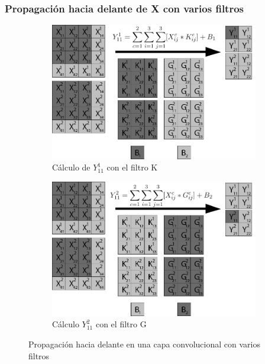 \subsubsection{Propagación hacia delante de X con varios filtros}

\begin{figure}[H]
	\centering
	\begin{subfigure}{.5\textwidth}
		\hspace{-10mm}
		\includegraphics[width=1.2\linewidth]{imagenes/conv_2kernels_1.jpg}  
		\caption{Cálculo de $Y^1_{11}$ con el filtro K}
	\end{subfigure}%
	\begin{subfigure}{.5\textwidth}
		\hspace{10mm}
		\includegraphics[width=1.2\linewidth]{imagenes/conv_2kernels_2.jpg}  
		\caption{Cálculo $Y^2_{11}$ con el filtro G}
	\end{subfigure}
	\caption{Propagación hacia delante en una capa convolucional con varios filtros}
	\label{fig:forward_prop_convolucional_varios_kernels}
\end{figure}


